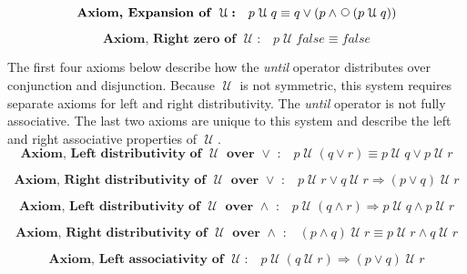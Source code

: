 \documentclass[12pt, fleqn, leqno]{article}
\newcommand{\impl}{\ensuremath{\Rightarrow}}        %
\newcommand{\Until}{\;\mathcal{U}\;}
\newcommand{\Next}{\;\,\text{\raisebox{3.5pt}{\circle{6}}}}
\newcommand{\firstspacer}{\vspace{-26pt}}
\begin{document}
\firstspacer

\begin{equation}\label{E:expansionUntil}
\textbf{Axiom, Expansion of $\Until$:}\quad p \Until q \equiv q \lor (p \land \Next (p \Until q))
\end{equation}

\firstspacer

\begin{equation}\label{E:untilFalse}
\textbf{Axiom, Right zero of $\Until$:}\quad p \Until false \equiv false
\end{equation}

The first four axioms below describe how the \textit{until} operator distributes over conjunction and disjunction.
Because $\Until$ is not symmetric, this system requires separate axioms for left and right distributivity.
The \textit{until} operator is not fully associative.
The last two axioms are unique to this system and describe the left and right associative properties of $\Until$.
\begin{equation}\label{E:untilOrEquiv}
\textbf{Axiom, Left distributivity of $\Until$ over $\lor$ :}\quad p \Until (q \lor r) \equiv p \Until q \lor p \Until r
\end{equation}

\firstspacer

\begin{equation}\label{E:untilOrImp}
\textbf{Axiom, Right distributivity of $\Until$ over $\lor$ :}\quad p \Until r \lor q \Until r \impl (p \lor q) \Until r
\end{equation}

\firstspacer

\begin{equation}\label{E:untilAndImp}
\textbf{Axiom, Left distributivity of $\Until$ over $\land$ :}\quad p \Until (q \land r) \impl p \Until q \land p \Until r
\end{equation}

\firstspacer

\begin{equation}\label{E:untilAndEquiv}
\textbf{Axiom, Right distributivity of $\Until$ over $\land$ :}\quad (p \land q) \Until r \equiv p \Until r \land q \Until r
\end{equation}

\firstspacer

\begin{equation}\label{E:leftAssocUntil}
\textbf{Axiom, Left associativity of $\Until$:}\quad p \Until (q \Until r) \impl (p\lor q) \Until r
\end{equation}
\end{document}
